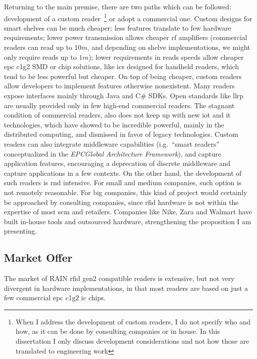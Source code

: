 Returning to the main premise, there are two paths which can be followed: development of a custom reader~\footnote{When I address the development of custom readers, I do not specify who and how, as it can be done by consulting companies or in house. In this dissertation I only discuss development considerations and not how those are translated to engineering work} or adopt a commercial one. 
Custom designs for smart shelves can be much cheaper: less features translate to few hardware requirements; lower power transmission allows cheaper \ac{rf} amplifiers (commercial readers can read up to $10m$, and depending on shelve implementations, we might only require reads up to $1m$); lower requirements in reads speeds allow cheaper \ac{epc} \ac{c1g2} SMD or chip solutions, like \acp{ic} designed for handheld readers, which tend to be less powerful but cheaper.
On top of being cheaper, custom readers allow developers to implement features otherwise nonexistent. Many readers expose interfaces mainly through Java and C\# SDKs. Open standards like \ac{llrp} are usually provided only in few high-end commercial readers. The stagnant condition of commercial readers, also does not keep up with new \ac{iot} and \ac{it} technologies, which have showed to be incredible powerful, mainly in the distributed computing, and dismissed in favor of legacy technologies.
Custom readers can also integrate middleware capabilities (i.g.\ ``smart readers'' conceptualized in the \emph{EPCGlobal Architecture Framework}), and capture application features, encouraging a deprecation of discrete middleware and capture applications in a few contexts.
On the other hand, the development of such readers is \ac{rnd} intensive. For small and medium companies, such option is not remotely reasonable. 
For big companies, this kind of project would certainly be approached by consulting companies, since \ac{rfid} hardware is not within the expertise of most \ac{scm} and retailers. Companies like Nike, Zara and Walmart have built in-house tools and outsourced hardware, strengthening the proposition I am presenting.

\subsection{Market Offer}

The market of RAIN \ac{rfid} \ac{gen2} compatible readers is extensive, but not very divergent in hardware implementations, in that most readers are based on just a few commercial \ac{epc} \ac{c1g2} \ac{ic} chips.

